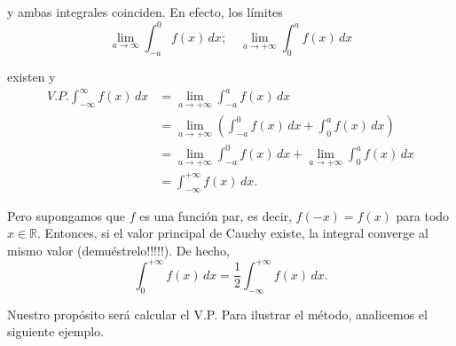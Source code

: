 y ambas integrales coinciden. En efecto, los límites
$$\lim_{a \to \infty} \int_{-a}^{0}f(x) \,dx; \quad \lim_{a \to + \infty} \int_{0}^{a}f(x) \,dx$$

existen y
\begin{align*}
   V.P. \int_{- \infty}^{\infty} f(x) \,dx &= \lim_{a\to + \infty} \int_{-a}^a f(x)\,dx  \\
   &= \lim_{a\to + \infty} \left(\int_{-a}^{0} f(x) \,dx + \int_0^a f(x) \,dx \right) \\
   &= \lim_{a\to + \infty} \int_{-a}^{0} f(x) \,dx +  \lim_{a\to + \infty}\int_0^a f(x) \,dx \\
   &= \int_{- \infty}^{+\infty} f(x) \,dx.
\end{align*} 

Pero supongamos que $f$ es una función par, es decir, $f(-x) = f(x)$ para todo $x \in \mathbb{R}$. Entonces, si el valor principal de Cauchy existe, la integral converge al mismo valor (demuéstrelo!!!!!). De hecho,
\begin{equation}
 \int_0^{+\infty} f(x) \,dx = \frac{1}{2} \int_{-\infty}^{+ \infty} f(x) \,dx. \label{IntIPar}   
\end{equation}

Nuestro propósito será calcular el V.P. Para ilustrar el método, analicemos el siguiente ejemplo.

